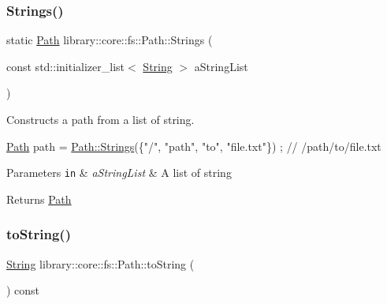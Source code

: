 \subsubsection{\texorpdfstring{Strings()}{Strings()}}
{\footnotesize\ttfamily static \hyperlink{classlibrary_1_1core_1_1fs_1_1_path}{Path} library\+::core\+::fs\+::\+Path\+::\+Strings (\begin{DoxyParamCaption}\item[{const std\+::initializer\+\_\+list$<$ \hyperlink{classlibrary_1_1core_1_1types_1_1_string}{String} $>$}]{a\+String\+List }\end{DoxyParamCaption})\hspace{0.3cm}{\ttfamily [static]}}



Constructs a path from a list of string. 


\begin{DoxyCode}
\hyperlink{classlibrary_1_1core_1_1fs_1_1_path_aabc4240fc08479d1bff6b9753f2b5cc2}{Path} path = \hyperlink{classlibrary_1_1core_1_1fs_1_1_path_a94a2bd454a137249bab970e29a5a95f2}{Path::Strings}(\{\textcolor{stringliteral}{"/"}, \textcolor{stringliteral}{"path"}, \textcolor{stringliteral}{"to"}, \textcolor{stringliteral}{"file.txt"}\}) ; \textcolor{comment}{// /path/to/file.txt}
\end{DoxyCode}



\begin{DoxyParams}[1]{Parameters}
\mbox{\tt in}  & {\em a\+String\+List} & A list of string \\
\hline
\end{DoxyParams}
\begin{DoxyReturn}{Returns}
\hyperlink{classlibrary_1_1core_1_1fs_1_1_path}{Path} 
\end{DoxyReturn}
\mbox{\label{classlibrary_1_1core_1_1fs_1_1_path_a6f78df53d8e604dd9e1b43e23311724a}} 
\subsubsection{\texorpdfstring{to\+String()}{toString()}}
{\footnotesize\ttfamily \hyperlink{classlibrary_1_1core_1_1types_1_1_string}{String} library\+::core\+::fs\+::\+Path\+::to\+String (\begin{DoxyParamCaption}{ }\end{DoxyParamCaption}) const}



